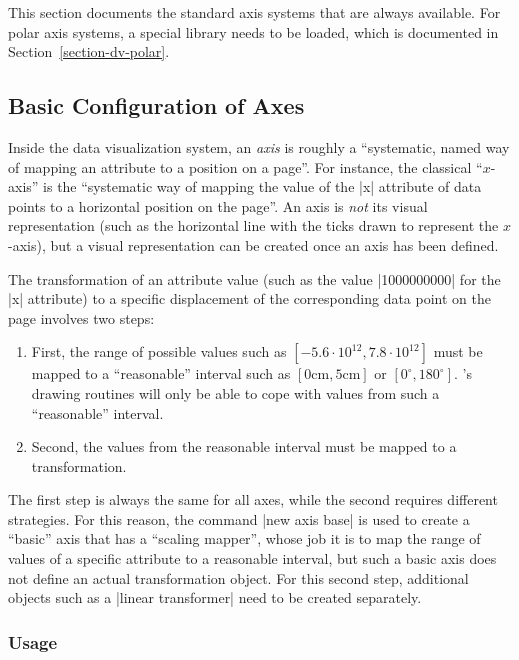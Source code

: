 This section documents the standard axis systems that are always
available. For polar axis systems, a special library needs to be
loaded, which is documented in Section~\ref{section-dv-polar}.



\subsection{Basic Configuration of Axes}
\label{section-dv-axes-main}

Inside the data visualization system, an \emph{axis} is roughly a
``systematic, named way of mapping an attribute to a 
position on a page''. For instance, the classical ``$x$-axis'' is the
``systematic way of mapping the value of the |x| attribute of data
points to a horizontal position on the page''. An axis is \emph{not}
its visual representation (such as the horizontal line with the ticks
drawn to represent the $x$-axis), but a visual representation can be
created once an axis has been defined.

The transformation of an attribute value (such as the value |1000000000|
for the |x| attribute) to a specific displacement of the corresponding
data point on the page involves two steps:
\begin{enumerate}
\item First, the range of possible values such as $[-5.6\cdot
  10^{12},7.8\cdot 10^{12}]$ must be mapped to a ``reasonable''
  interval such as $[0\mathrm{cm},5\mathrm{cm}]$ or
  $[0^\circ,180^\circ]$. \tikzname's drawing routines will only be
  able to cope with values from such a ``reasonable'' interval.
\item Second, the values from the reasonable interval must be mapped
  to a transformation.
\end{enumerate}
The first step is always the same for all axes, while the second
requires different strategies. For this reason, the command
|new axis base| is used to create a ``basic'' axis that has a
``scaling mapper'', whose job it is to map the range of values of a
specific attribute to a reasonable interval, but such a basic axis
does not define an actual transformation object. For this second step,
additional objects such as a |linear transformer| need to be created
separately. 


\subsubsection{Usage}

